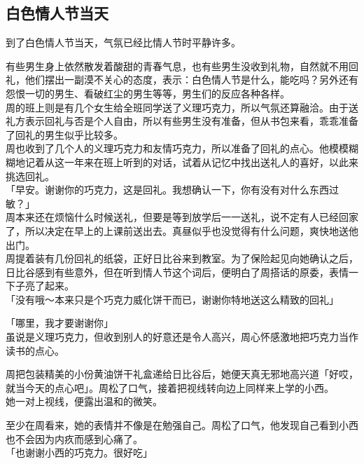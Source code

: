 \subsection{白色情人节当天}

到了白色情人节当天，气氛已经比情人节时平静许多。

有些男生身上依然散发着酸甜的青春气息，也有些男生没收到礼物，自然就不用回礼，他们摆出一副漠不关心的态度，表示：白色情人节是什么，能吃吗？另外还有怨恨一切的男生、看破红尘的男生等等，男生们的反应各种各样。\\

周的班上则是有几个女生给全班同学送了义理巧克力，所以气氛还算融洽。由于送礼方表示回礼与否是个人自由，所以有些男生没有准备，但从书包来看，乖乖准备了回礼的男生似乎比较多。\\

周也收到了几个人的义理巧克力和友情巧克力，所以准备了回礼的点心。他模模糊糊地记着从这一年来在班上听到的对话，试着从记忆中找出送礼人的喜好，以此来挑选回礼。\\

「早安。谢谢你的巧克力，这是回礼。我想确认一下，你有没有对什么东西过敏？」\\

周本来还在烦恼什么时候送礼，但要是等到放学后一一送礼，说不定有人已经回家了，所以决定在早上的上课前送出去。真昼似乎也没觉得有什么问题，爽快地送他出门。\\

周提着装有几份回礼的纸袋，正好日比谷来到教室。为了保险起见向她确认之后，日比谷感到有些意外，但在听到情人节这个词后，便明白了周搭话的原委，表情一下子亮了起来。\\

「没有哦～本来只是个巧克力威化饼干而已，谢谢你特地送这么精致的回礼」

「哪里，我才要谢谢你」\\

虽说是义理巧克力，但收到别人的好意还是令人高兴，周心怀感激地把巧克力当作读书的点心。

周把包装精美的小份黄油饼干礼盒递给日比谷后，她便天真无邪地高兴道「好哎，就当今天的点心吧」。周松了口气，接着把视线转向边上同样来上学的小西。\\

她一对上视线，便露出温和的微笑。

至少在周看来，她的表情并不像是在勉强自己。周松了口气，他发现自己看到小西也不会因为内疚而感到心痛了。\\

「也谢谢小西的巧克力。很好吃」

